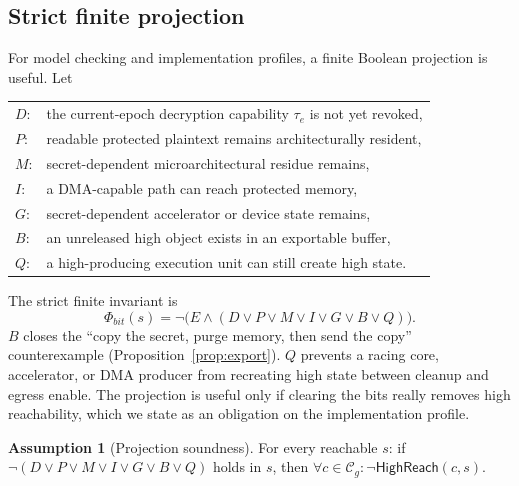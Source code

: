 \documentclass[11pt,letterpaper]{article}
\theoremstyle{plain}
\theoremstyle{definition}
\newtheorem{assumption}{Assumption}
\newcommand{\HR}{\mathsf{HighReach}}
\newcommand{\Cg}{\mathcal{C}_g}
\begin{document}
\subsection{Strict finite projection}
For model checking and implementation profiles, a finite Boolean projection is useful. Let
\begin{center}
\begin{tabular}{@{}ll@{}}
$D$: & the current-epoch decryption capability $\tau_{e}$ is not yet revoked, \\
$P$: & readable protected plaintext remains architecturally resident, \\
$M$: & secret-dependent microarchitectural residue remains, \\
$I$: & a DMA-capable path can reach protected memory, \\
$G$: & secret-dependent accelerator or device state remains, \\
$B$: & an unreleased high object exists in an exportable buffer, \\
$Q$: & a high-producing execution unit can still create high state.
\end{tabular}
\end{center}
The strict finite invariant is
\begin{equation}\label{eq:phibit}
\Phi_{bit}(s) = \neg\big(E \wedge (D \vee P \vee M \vee I \vee G \vee B \vee Q)\big).
\end{equation}
$B$ closes the ``copy the secret, purge memory, then send the copy'' counterexample (Proposition~\ref{prop:export}). $Q$ prevents a racing core, accelerator, or DMA producer from recreating high state between cleanup and egress enable. The projection is useful only if clearing the bits really removes high reachability, which we state as an obligation on the implementation profile.

\begin{assumption}[Projection soundness]\label{as:proj}
For every reachable $s$: if $\neg(D \vee P \vee M \vee I \vee G \vee B \vee Q)$ holds in $s$, then $\forall c \in \Cg : \neg\HR(c,s)$.
\end{assumption}
\end{document}
